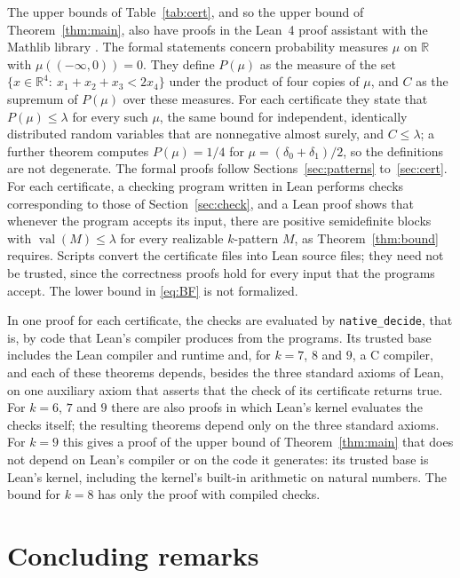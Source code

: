\documentclass[11pt]{amsart}
\theoremstyle{definition}
\theoremstyle{remark}
\numberwithin{equation}{section}
\newcommand{\R}{\mathbb{R}}
\newcommand{\val}{\operatorname{val}}
\begin{document}
The upper bounds of Table~\ref{tab:cert}, and so the upper bound of Theorem~\ref{thm:main}, also have proofs in the Lean~4 proof assistant \cite{Lean4} with the Mathlib library \cite{Mathlib}. The formal statements concern probability measures $\mu$ on $\R$ with $\mu((-\infty,0))=0$. They define $P(\mu)$ as the measure of the set $\{x\in\R^4:\ x_1+x_2+x_3<2x_4\}$ under the product of four copies of $\mu$, and $C$ as the supremum of $P(\mu)$ over these measures. For each certificate they state that $P(\mu)\le\lambda$ for every such $\mu$, the same bound for independent, identically distributed random variables that are nonnegative almost surely, and $C\le\lambda$; a further theorem computes $P(\mu)=1/4$ for $\mu=(\delta_0+\delta_1)/2$, so the definitions are not degenerate. The formal proofs follow Sections~\ref{sec:patterns} to~\ref{sec:cert}. For each certificate, a checking program written in Lean performs checks corresponding to those of Section~\ref{sec:check}, and a Lean proof shows that whenever the program accepts its input, there are positive semidefinite blocks with $\val(M)\le\lambda$ for every realizable $k$-pattern $M$, as Theorem~\ref{thm:bound} requires. Scripts convert the certificate files into Lean source files; they need not be trusted, since the correctness proofs hold for every input that the programs accept. The lower bound in \eqref{eq:BF} is not formalized.

In one proof for each certificate, the checks are evaluated by \texttt{native\_decide}, that is, by code that Lean's compiler produces from the programs. Its trusted base includes the Lean compiler and runtime and, for $k=7$, $8$ and $9$, a C compiler, and each of these theorems depends, besides the three standard axioms of Lean, on one auxiliary axiom that asserts that the check of its certificate returns true. For $k=6$, $7$ and $9$ there are also proofs in which Lean's kernel evaluates the checks itself; the resulting theorems depend only on the three standard axioms. For $k=9$ this gives a proof of the upper bound of Theorem~\ref{thm:main} that does not depend on Lean's compiler or on the code it generates: its trusted base is Lean's kernel, including the kernel's built-in arithmetic on natural numbers. The bound for $k=8$ has only the proof with compiled checks.

\section{Concluding remarks}\label{sec:dual}
\end{document}
